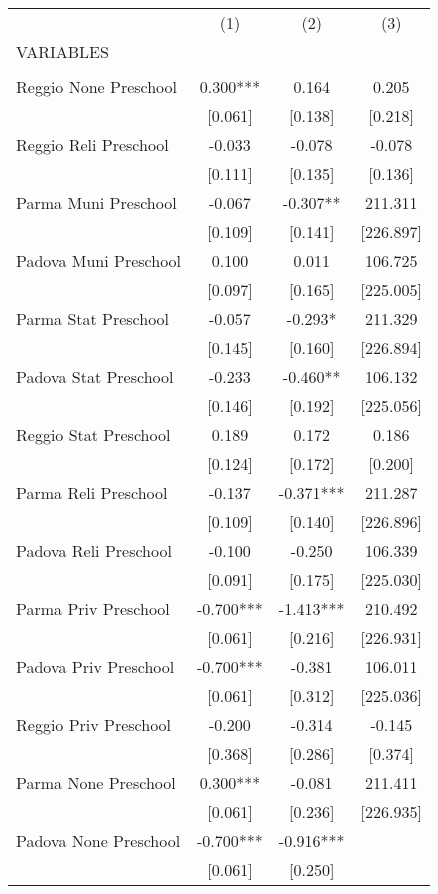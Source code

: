 \begin{tabular}{lccc} \hline
 & (1) & (2) & (3) \\
VARIABLES &  &  &  \\ \hline
 &  &  &  \\
Reggio None Preschool & 0.300*** & 0.164 & 0.205 \\
 & [0.061] & [0.138] & [0.218] \\
Reggio Reli Preschool & -0.033 & -0.078 & -0.078 \\
 & [0.111] & [0.135] & [0.136] \\
Parma Muni Preschool & -0.067 & -0.307** & 211.311 \\
 & [0.109] & [0.141] & [226.897] \\
Padova Muni Preschool & 0.100 & 0.011 & 106.725 \\
 & [0.097] & [0.165] & [225.005] \\
Parma Stat Preschool & -0.057 & -0.293* & 211.329 \\
 & [0.145] & [0.160] & [226.894] \\
Padova Stat Preschool & -0.233 & -0.460** & 106.132 \\
 & [0.146] & [0.192] & [225.056] \\
Reggio Stat Preschool & 0.189 & 0.172 & 0.186 \\
 & [0.124] & [0.172] & [0.200] \\
Parma Reli Preschool & -0.137 & -0.371*** & 211.287 \\
 & [0.109] & [0.140] & [226.896] \\
Padova Reli Preschool & -0.100 & -0.250 & 106.339 \\
 & [0.091] & [0.175] & [225.030] \\
Parma Priv Preschool & -0.700*** & -1.413*** & 210.492 \\
 & [0.061] & [0.216] & [226.931] \\
Padova Priv Preschool & -0.700*** & -0.381 & 106.011 \\
 & [0.061] & [0.312] & [225.036] \\
Reggio Priv Preschool & -0.200 & -0.314 & -0.145 \\
 & [0.368] & [0.286] & [0.374] \\
Parma None Preschool & 0.300*** & -0.081 & 211.411 \\
 & [0.061] & [0.236] & [226.935] \\
Padova None Preschool & -0.700*** & -0.916*** &  \\
 & [0.061] & [0.250] &  \\

\end{tabular}

